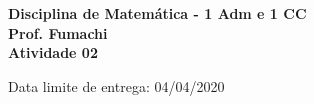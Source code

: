 \documentclass{article}
\begin{document}
\pagestyle{empty}






\begin{center}\textbf{\Large{Disciplina de Matemática - 1 Adm e 1 CC \\ Prof. Fumachi \\ \vspace{0.5cm} Atividade 02}}\end{center}
\begin{center}\large{Data limite de entrega: 04/04/2020}\end{center}
	
\end{document}
